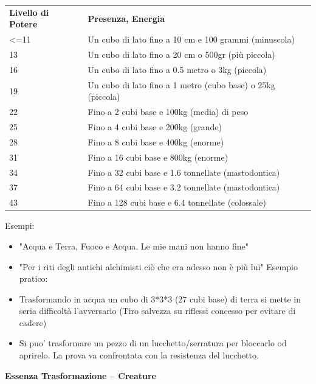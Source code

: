 \documentclass[a4paper,11pt,twoside,openany]{book}
\begin{document}
\bigskip
\begin{tabularx}{0.95\textwidth}{lX}
	\toprule
	\textbf{Livello di Potere} & \textbf{Presenza, Energia}\\
	\textless=11& Un cubo di lato fino a 10 cm e 100 grammi (minuscola)\\
	13& Un cubo di lato fino a 20 cm o 500gr (più piccola)\\
	16& Un cubo di lato fino a 0.5 metro o 3kg (piccola)\\
	19& Un cubo di lato fino a 1 metro (cubo base) o 25kg (piccola)\\
	22& Fino a 2 cubi base e 100kg (media) di peso\\
	25& Fino a 4 cubi base e 200kg (grande)\\
	28& Fino a 8 cubi base e 400kg (enorme)\\
	31& Fino a 16 cubi base e 800kg (enorme)\\
	34& Fino a 32 cubi base e 1.6 tonnellate (mastodontica)\\
	37& Fino a 64 cubi base e 3.2 tonnellate (mastodontica)\\
	43& Fino a 128 cubi base e 6.4 tonnellate (colossale)\\
\end{tabularx}

Esempi:
\begin{itemize}
	\item
	      "Acqua e Terra, Fuoco e Acqua. Le mie mani non hanno fine"
	\item
	      "Per i riti degli antichi alchimisti ciò che era adesso non è più lui"
	      Esempio pratico:
	\item
	      Trasformando in acqua un cubo di 3{*}3{*}3 (27 cubi base) di terra si mette in seria difficoltà l'avversario (Tiro salvezza su riflessi concesso per evitare di cadere)
	\item
  Si puo' trasformare un pezzo di un lucchetto/serratura per bloccarlo od aprirelo. La prova va confrontata con la resistenza del lucchetto.      
\end{itemize}

\bigskip

\textbf{Essenza Trasformazione -- Creature}
\end{document}
